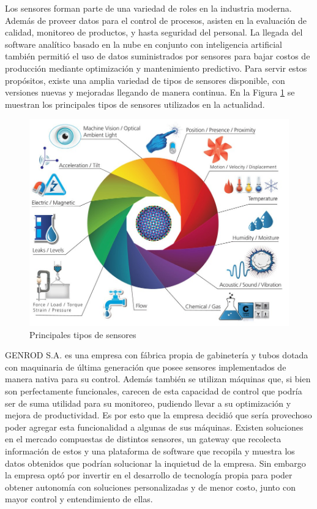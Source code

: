 \documentclass[11pt]{charter}
\begin{document}
Los sensores forman parte de una variedad de roles en la industria moderna. Además de proveer datos para el control de procesos, asisten en la evaluación de calidad, monitoreo de productos, y hasta seguridad del personal. La llegada del software analítico basado en la nube en conjunto con inteligencia artificial también permitió el uso de datos suministrados por sensores para bajar costos de producción mediante optimización y mantenimiento predictivo.
Para servir estos propósitos, existe una amplia variedad de tipos de sensores disponible, con versiones nuevas y mejoradas llegando de manera continua. En la Figura \ref{fig:sensores} se muestran los principales tipos de sensores utilizados en la actualidad.

\vspace{25px}

\begin{figure}[htpb]
\centering 
\includegraphics[width=.7\textwidth]{./Figuras/sensores.png}
\caption{Principales tipos de sensores}
\label{fig:sensores}
\end{figure}

\vspace{25px}

GENROD S.A. es una empresa con fábrica propia de gabinetería y tubos dotada con maquinaria de última generación que posee sensores implementados de manera nativa para su control.
Además también se utilizan máquinas que, si bien son perfectamente funcionales, carecen de esta capacidad de control que podría ser de suma utilidad para su monitoreo, pudiendo llevar a su optimización y mejora de productividad. Es por esto que la empresa decidió que sería provechoso poder agregar esta funcionalidad a algunas de sus máquinas.
Existen soluciones en el mercado compuestas de distintos sensores, un gateway que recolecta información de estos y una plataforma de software que recopila y muestra los datos obtenidos que podrían solucionar la inquietud de la empresa. Sin embargo la empresa optó por invertir en el desarrollo de tecnología propia para poder obtener autonomía con soluciones personalizadas y de menor costo, junto con mayor control y entendimiento de ellas.
\end{document}
